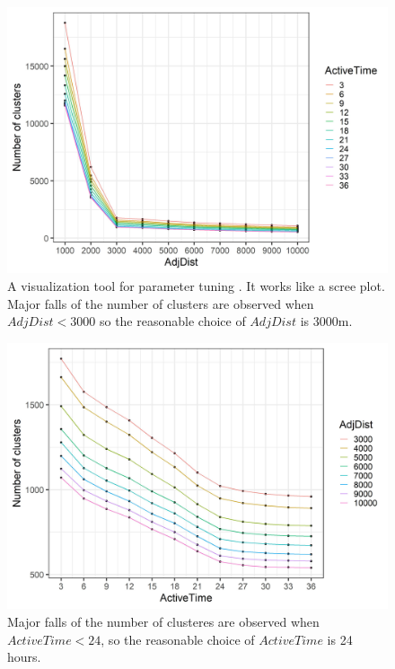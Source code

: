 \begin{Schunk}
\begin{figure}

{\centering \includegraphics[width=0.8\linewidth]{figures/clustering_tuning_1} 

}

\caption[A visualization tool for parameter tuning ]{A visualization tool for parameter tuning . It works like a scree plot. Major falls of the number of clusters are observed when $AdjDist < 3000$ so the reasonable choice of $AdjDist$ is 3000m.}\label{fig:vis1}
\end{figure}
\end{Schunk}

\begin{Schunk}
\begin{figure}

{\centering \includegraphics[width=0.8\linewidth]{figures/clustering_tuning_2} 

}

\caption[Major falls of the number of clusteres are observed when $ActiveTime < 24$, so the reasonable choice of $ActiveTime$ is 24 hours]{Major falls of the number of clusteres are observed when $ActiveTime < 24$, so the reasonable choice of $ActiveTime$ is 24 hours.}\label{fig:vis2}
\end{figure}
\end{Schunk}

